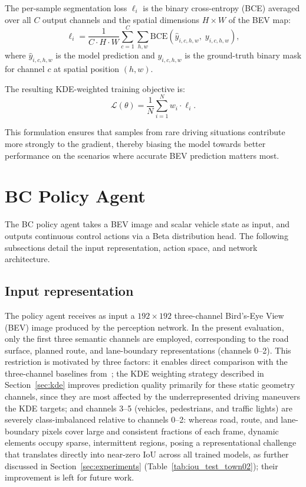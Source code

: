\documentclass[12pt]{article}
\begin{document}
The per-sample segmentation loss $\ell_i$ is the binary cross-entropy (BCE) averaged over all $C$ output channels and the spatial dimensions $H \times W$ of the BEV map:
\begin{equation}
    \ell_i = \frac{1}{C \cdot H \cdot W} \sum_{c=1}^{C} \sum_{h,w}
    \mathrm{BCE}\!\left(\hat{y}_{i,c,h,w},\; y_{i,c,h,w}\right),
\end{equation}
where $\hat{y}_{i,c,h,w}$ is the model prediction and $y_{i,c,h,w}$ is the ground-truth binary mask for channel $c$ at spatial position $(h, w)$.

The resulting KDE-weighted training objective is:
\begin{equation}
    \mathcal{L}(\theta) = \frac{1}{N} \sum_{i=1}^{N} w_i \cdot \ell_i.
    \label{eq:weighted_loss}
\end{equation}

This formulation ensures that samples from rare driving situations contribute more strongly to the gradient, thereby biasing the model towards better performance on the scenarios where accurate BEV prediction matters most.

\section{BC Policy Agent}
\label{sec:agent}
The BC policy agent takes a BEV image and scalar vehicle state as input, and outputs continuous control actions via a Beta distribution head. The following subsections detail the input representation, action space, and network architecture.


\subsection{Input representation}
The policy agent receives as input a $192 \times 192$ three-channel Bird's-Eye View (BEV) image produced by the perception network. In the present evaluation, only the first three semantic channels are employed, corresponding to the road surface, planned route, and lane-boundary representations (channels 0--2). This restriction is motivated by three factors: it enables direct comparison with the three-channel baselines from~\cite{santos2025initial}; the KDE weighting strategy described in Section~\ref{sec:kde} improves prediction quality primarily for these static geometry channels, since they are most affected by the underrepresented driving maneuvers the KDE targets; and channels 3--5 (vehicles, pedestrians, and traffic lights) are severely class-imbalanced relative to channels 0--2: whereas road, route, and lane-boundary pixels cover large and consistent fractions of each frame, dynamic elements occupy sparse, intermittent regions, posing a representational challenge that translates directly into near-zero IoU across all trained models, as further discussed in Section~\ref{sec:experiments} (Table~\ref{tab:iou_test_town02}); their improvement is left for future work.
\end{document}
